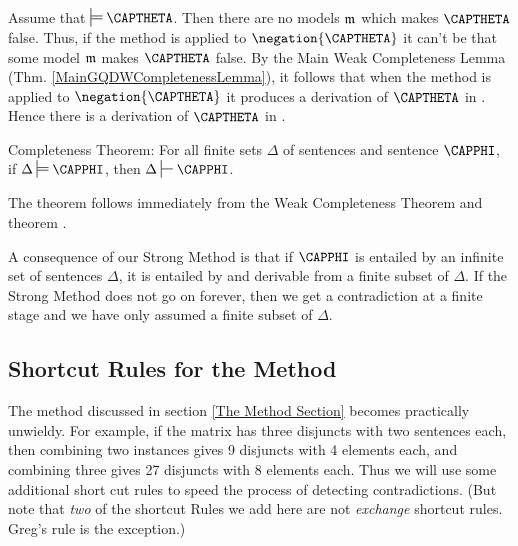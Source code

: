 \begin{PROOF}
Assume that $\sdtstile{}{}\CAPTHETA$. Then there are no models $\mathfrak{m}$ which makes $\CAPTHETA$ false. 
Thus, if the method is applied to $\negation{\CAPTHETA}$ it can't be that some model $\mathfrak{m}$ makes $\CAPTHETA$ false. 
By the Main \GQD{} Weak Completeness Lemma (Thm. \ref{MainGQDWCompletenessLemma}), it follows that when the method is applied to $\negation{\CAPTHETA}$ it produces a derivation of $\CAPTHETA$ in \GQDP{}. 
Hence there is a derivation of $\CAPTHETA$ in \GQD{}.
\end{PROOF}
\begin{THEOREM}{ \GQD{} Completeness Theorem:}
For all finite sets $\Delta$ of \GQL{} sentences and \GQL{} sentence $\CAPPHI$, if $\Delta\sdtstile{}{}\CAPPHI$, then $\Delta\sststile{}{}\CAPPHI$.
\end{THEOREM}
\begin{PROOF}
The theorem follows immediately from the Weak \GQD{} Completeness Theorem and theorem .
\end{PROOF}

A consequence of our Strong Method  is that if $\CAPPHI$ is  entailed by an infinite set of sentences $\Delta$, it is entailed by and derivable from  a finite subset of $\Delta$.  If the Strong Method does not go on forever, then we get a contradiction at a finite stage and we have only assumed a finite subset of $\Delta$.

\subsection{Shortcut Rules for the Method}
The method discussed in section \ref{The Method Section} becomes practically unwieldy.
For example, if the matrix has three disjuncts with two sentences each, then combining two instances gives 9 disjuncts with 4 elements each, and combining three gives 27 disjuncts with 8 elements each. 
Thus we will use some additional short cut rules to speed the process of detecting contradictions. 
(But note that \emph{two} of the shortcut Rules we add here are not \emph{exchange} shortcut rules.  Greg's rule is the exception.)

